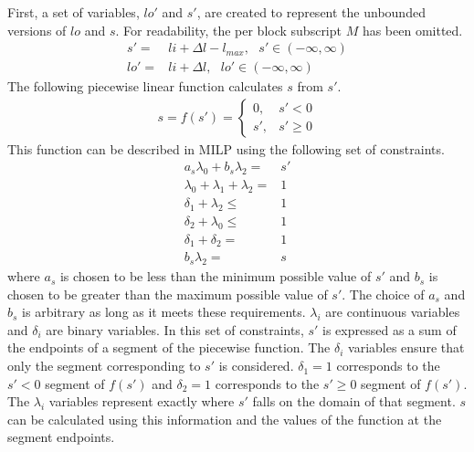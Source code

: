 First, a
set of variables, $lo'$ and $s'$, are created to represent the unbounded
versions of $lo$ and $s$. For readability, the per block subscript $M$ has been
omitted.
\begin{align*}
s' =& li + \Delta l - l_{max}, \text{ } s' \in (-\infty, \infty)\\
lo' =& li + \Delta l, \text{ } lo' \in (-\infty, \infty) 
\end{align*}
The following piecewise linear function calculates $s$ from $s'$.
\begin{align*}
s = f(s') = 
  \begin{cases} 
  0, &s' < 0\\
  s', &s' \geq 0
  \end{cases}
\end{align*}
This function can be described in MILP using the following set of constraints.
\begin{align*}
  a_s\lambda_0 + b_s\lambda_2 =& s'\\
  \lambda_0 + \lambda_1 + \lambda_2 =& 1 \\
  \delta_1 + \lambda_2 \leq& 1 \\
  \delta_2 + \lambda_0 \leq& 1 \\
  \delta_1 + \delta_2 =& 1 \\
  b_s\lambda_2 =& s
\end{align*}
where $a_s$ is chosen to be less than the minimum possible value of $s'$ and $b_s$
is chosen to be greater than the maximum possible value of $s'$. The choice of
$a_s$ and $b_s$ is arbitrary as long as it meets these requirements. $\lambda_i$
are continuous variables and $\delta_i$ are binary variables. In this set of
constraints, $s'$ is expressed as a sum of the endpoints of a segment of the 
piecewise function. The $\delta_i$ variables ensure that only the segment
corresponding to $s'$ is considered. $\delta_1 = 1$ corresponds to the $s' < 0$
segment of $f(s')$ and $\delta_2 = 1$ corresponds to the $s' \geq 0$ segment of
$f(s')$. The $\lambda_i$ variables represent exactly where
$s'$ falls on the domain of that segment. $s$ can be calculated using this
information and the values of the function at the segment endpoints.

